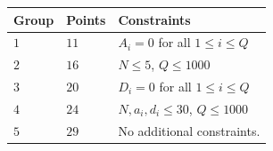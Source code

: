 \noindent
\begin{tabular}{| l | l | p{12cm} |}
  \hline
  \textbf{Group} & \textbf{Points} & \textbf{Constraints} \\ \hline
  $1$   & $11$       & $A_i = 0$ for all $1 \leq i \leq Q$\\ \hline
  $2$   & $16$       & $N \leq 5$, $Q  \leq 1000$ \\ \hline
  $3$   & $20$       & $D_i = 0$ for all $1 \leq i \leq Q$ \\ \hline
  $4$   & $24$       & $N, a_i, d_i \leq 30$, $Q \leq 1000$ \\ \hline
  $5$   & $29$       & No additional constraints. \\ \hline
\end{tabular}
